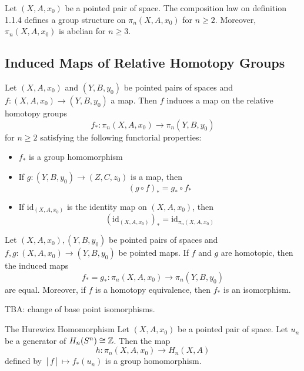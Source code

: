 \documentclass[a4paper]{article}
\begin{document}
\begin{thm}{}{} Let $(X,A,x_0)$ be a pointed pair of space. The composition law on definition 1.1.4 defines a group structure on $\pi_n(X,A,x_0)$ for $n\geq 2$. Moreover, $\pi_n(X,A,x_0)$ is abelian for $n\geq 3$. 
\end{thm}

\subsection{Induced Maps of Relative Homotopy Groups}
\begin{thm}{}{} Let $(X,A,x_0)$ and $(Y,B,y_0)$ be pointed pairs of spaces and $f:(X,A,x_0)\to(Y,B,y_0)$ a map. Then $f$ induces a map on the relative homotopy groups $$f_\ast:\pi_n(X,A,x_0)\to\pi_n(Y,B,y_0)$$ for $n\geq 2$ satisfying the following functorial properties: 
\begin{itemize}
\item $f_\ast$ is a group homomorphism
\item If $g:(Y,B,y_0)\to(Z,C,z_0)$ is a map, then $$(g\circ f)_\ast=g_\ast\circ f_\ast$$
\item If $\text{id}_{(X,A,x_0)}$ is the identity map on $(X,A,x_0)$, then $$(\text{id}_{(X,A,x_0)})_\ast=\text{id}_{\pi_n(X,A,x_0)}$$
\end{itemize}
\end{thm}

\begin{prp}{}{} Let $(X,A,x_0),(Y,B,y_0)$ be pointed pairs of spaces and $f,g:(X,A,x_0)\to (Y,B,y_0)$ be pointed maps. If $f$ and $g$ are homotopic, then the induced maps $$f_\ast=g_\ast:\pi_n(X,A,x_0)\to\pi_n(Y,B,y_0)$$ are equal. Moreover, if $f$ is a homotopy equivalence, then $f_\ast$ is an isomorphism. 
\end{prp}

TBA: change of base point isomorphisms. 

\begin{thm}{The Hurewicz Homomorphism}{} Let $(X,A,x_0)$ be a pointed pair of space. Let $u_n$ be a generator of $H_n(S^n)\cong\mathbb{Z}$. Then the map $$h:\pi_n(X,A,x_0)\to H_n(X,A)$$ defined by $[f]\mapsto f_\ast(u_n)$ is a group homomorphism. 
\end{thm}
\end{document}
